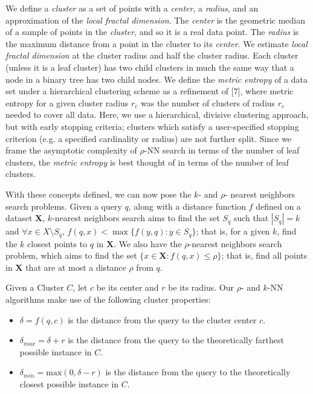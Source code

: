 We define a \emph{cluster} as a set of points with a \emph{center}, a \emph{radius}, and an approximation of the \emph{local fractal dimension}.
The \emph{center} is the geometric median of a sample of points in the \emph{cluster}, and so it is a real data point. The \emph{radius} is the
maximum distance from a point in the cluster to its \emph{center}. We estimate \emph{local fractal dimension} at the cluster radius and half
the cluster radius. Each cluster (unless it is a leaf cluster) has two child clusters in much the same way that a node in
a binary tree has two child nodes. We define the \emph{metric entropy} of a data set under a hierarchical clustering scheme as a refinement of [7], where
metric entropy for a given cluster radius $r_c$ was the number of clusters of radius $r_c$ needed to cover all data. Here, we use a hierarchical, divisive clustering 
approach, but with early stopping criteria; clusters which satisfy a user-specified stopping criterion (e.g. a specified cardinality or radius) are not further split. 
Since we frame the asymptotic complexity of $\rho$-NN search in terms of the number of leaf clusters, the \emph{metric entropy} is best thought of in terms of the number of
leaf clusters. 


With these concepts defined, we can now pose the $k$- and $\rho$- nearest neighbors search problems.
Given a query $q$, along with a distance function $f$ defined on a dataset $\textbf{X}$, $k$-nearest neighbors search aims to find 
the set $S_q$ such that  $|S_q| = k$ and $\forall x \in X \setminus S_q$, $f(q, x) < \max\{f(y, q): y \in S_q \}$; that is,
for a given $k$, find the $k$ closest points to $q$ in $ \textbf{X}$.
We also have the $\rho$-nearest neighbors search problem, which aims to find the set $\{x \in \textbf{X}: f(q, x) \leq \rho \}$; that is, 
find all points in $\textbf{X}$ that are at most a distance $\rho$ from $q$.

Given a Cluster $C$, let $c$ be its center and $r$ be its radius. Our $\rho$- and $k$-NN algorithms make use of the following cluster 
properties:
\begin{itemize}
    \item $\delta = f(q, c)$ is the distance from the query to the cluster center $c$.
    \item $\delta_{max} = \delta + r$ is the distance from the query to the theoretically farthest possible instance in $C$.
    \item $\delta_{min} = \text{max}(0, \delta - r)$ is the distance from the query to the theoretically closest possible instance in $C$.
\end{itemize}


